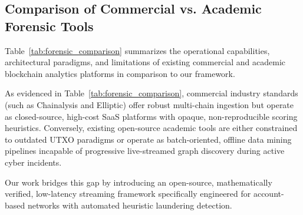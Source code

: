 \subsection{Comparison of Commercial vs. Academic Forensic Tools}

Table~\ref{tab:forensic_comparison} summarizes the operational capabilities, architectural paradigms, and limitations of existing commercial and academic blockchain analytics platforms in comparison to our framework.

\begin{table}[t]
\centering
\caption{Systematic Comparison of Cryptocurrency Forensic and Graph Analytics Frameworks.}
\label{tab:forensic_comparison}
\end{table}

As evidenced in Table~\ref{tab:forensic_comparison}, commercial industry standards (such as Chainalysis and Elliptic) offer robust multi-chain ingestion but operate as closed-source, high-cost SaaS platforms with opaque, non-reproducible scoring heuristics. Conversely, existing open-source academic tools are either constrained to outdated UTXO paradigms or operate as batch-oriented, offline data mining pipelines incapable of progressive live-streamed graph discovery during active cyber incidents.

Our work bridges this gap by introducing an open-source, mathematically verified, low-latency streaming framework specifically engineered for account-based networks with automated heuristic laundering detection.
